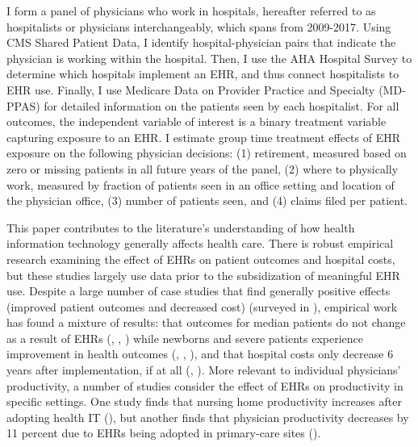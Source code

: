 \documentclass[12pt]{article}
\begin{document}
I form a panel of physicians who work in hospitals, hereafter referred to as hospitalists or physicians interchangeably, which spans from 2009-2017. Using CMS Shared Patient Data, I identify hospital-physician pairs that indicate the physician is working within the hospital. Then, I use the AHA Hospital Survey to determine which hospitals implement an EHR, and thus connect hospitalists to EHR use. Finally, I use Medicare Data on Provider Practice and Specialty (MD-PPAS) for detailed information on the patients seen by each hospitalist. For all outcomes, the independent variable of interest is a binary treatment variable capturing exposure to an EHR. I estimate group time treatment effects of EHR exposure on the following physician decisions: (1) retirement, measured based on zero or missing patients in all future years of the panel, (2) where to physically work, measured by fraction of patients seen in an office setting and location of the physician office, (3) number of patients seen, and (4) claims filed per patient. 

This paper contributes to the literature's understanding of how health information technology generally affects health care. There is robust empirical research examining the effect of EHRs on patient outcomes and hospital costs, but these studies largely use data prior to the subsidization of meaningful EHR use. Despite a large number of case studies that find generally positive effects (improved patient outcomes and decreased cost) (surveyed in \cite{Buntin2011TheResults}), empirical work has found a mixture of results: that outcomes for median patients do not change as a result of EHRs (\cite{Agha2014TheCare}, \cite{McCullough2016HealthCoordination}, \cite{Meyerhoefer}) while newborns and severe patients experience improvement in health outcomes (\cite{Miller2009}, \cite{Freedman2015}, \cite{McCullough2016HealthCoordination}), and that hospital costs only decrease 6 years after implementation, if at all (\cite{Agha2014TheCare}, \cite{dranove2014trillion}). More relevant to individual physicians' productivity, a number of studies consider the effect of EHRs on productivity in specific settings. One study finds that nursing home productivity increases after adopting health IT (\cite{Hitt2016}), but another finds that physician productivity decreases by 11 percent due to EHRs being adopted in primary-care sites (\cite{Meyerhoefer}).  
\end{document}
